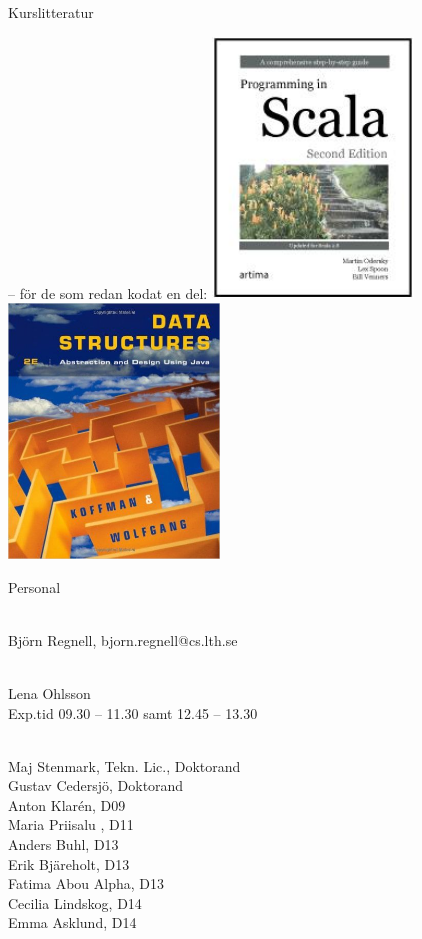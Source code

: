 \begin{Slide}{Kurslitteratur}
\begin{minipage}{0.45\textwidth}
\noindent -- för de som redan kodat en del:
\vskip0.7mm
\includegraphics[width=0.4\textwidth]{../img/pinsbook.jpg}\hskip1mm
\includegraphics[width=0.42\textwidth]{../img/koffmanbook.jpg}
\end{minipage}
\end{Slide}

\ifkompendium\else
\begin{Slide}{Personal}
\begin{description}\small
\item [\bfseries Kursansvarig:] ~\\Björn Regnell, bjorn.regnell@cs.lth.se
\item [\bfseries Kurssekreterare:]  ~\\Lena Ohlsson \\Exp.tid 09.30 -- 11.30 samt 12.45 -- 13.30
\item [\bfseries Handledare:] ~\\
Maj	Stenmark,	Tekn. Lic., Doktorand\\
Gustav	Cedersjö,	Doktorand\\
Anton	Klarén,	D09\\
Maria	Priisalu	, D11\\
Anders	Buhl,	D13\\
Erik	Bjäreholt,	D13\\
Fatima	Abou Alpha,	D13\\
Cecilia	Lindskog,	D14\\
Emma	Asklund,	D14\\
\end{description}
\end{Slide}
\fi

